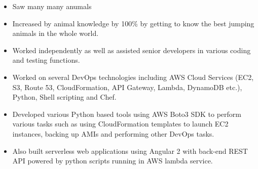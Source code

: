 \documentclass[10pt,a4paper,ragged2e]{maltacv}
\begin{document}
\medskip
\begin{multicols}{3}


  \vfill\null
  \columnbreak


  \vfill\null
  \columnbreak

  \vfill\null
  \columnbreak

\end{multicols}

\medskip
{}

\begin{itemize}
  \item Saw many many anumals 
  \item Increased by animal knowledge by 100\% by getting to know the best jumping animals in the whole world.
\end{itemize}

\divider

\begin{itemize}
  \item Worked independently as well as assisted senior developers in various coding and testing functions. 
  \item Worked on several DevOps technologies including AWS Cloud Services (EC2, S3, Route 53, CloudFormation, API Gateway, Lambda, DynamoDB etc.), Python, Shell scripting and Chef. 
  \item Developed various Python based tools using AWS Boto3 SDK to perform various tasks such as using CloudFormation templates to launch EC2 instances, backing up AMIs and performing other DevOps tasks. 
  \item Also built serverless web applications using Angular 2 with back-end REST API powered by python scripts running in AWS lambda service.
\end{itemize}
\end{document}
